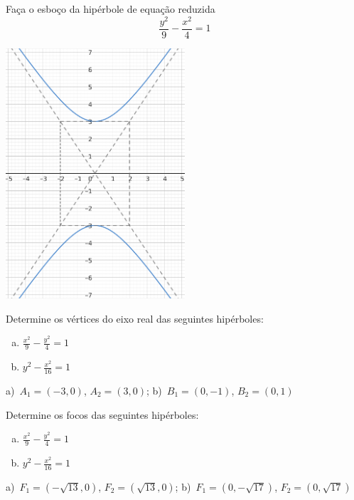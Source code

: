 \begin{exeresol}
  Faça o esboço da hipérbole de equação reduzida
  \begin{equation}
    \frac{y^2}{9} - \frac{x^2}{4} = 1
  \end{equation}
\end{exeresol}
\begin{resp}
  \includegraphics[width=0.5\textwidth]{cap_conicas/dados/fig_hiperbole_exer_oy/fig}
\end{resp}

\begin{exer}
  Determine os vértices do eixo real das seguintes hipérboles:
  \begin{enumerate}[a)]
  \item $\displaystyle \frac{x^2}{9} - \frac{y^2}{4} = 1$
  \item $\displaystyle y^2 - \frac{x^2}{16} = 1$
  \end{enumerate}
\end{exer}
\begin{resp}
  a)~$A_1=(-3,0)$, $A_2=(3,0)$; b)~$B_1=(0, -1)$, $B_2=(0, 1)$
\end{resp}

\begin{exer}
  Determine os focos das seguintes hipérboles:
  \begin{enumerate}[a)]
  \item $\displaystyle \frac{x^2}{9} - \frac{y^2}{4} = 1$
  \item $\displaystyle y^2 - \frac{x^2}{16} = 1$
  \end{enumerate}
\end{exer}
\begin{resp}
  a)~$F_1=(-\sqrt{13}, 0)$, $F_2=(\sqrt{13}, 0)$; b)~$F_1=(0, -\sqrt{17})$, $F_2=(0, \sqrt{17})$
\end{resp}


